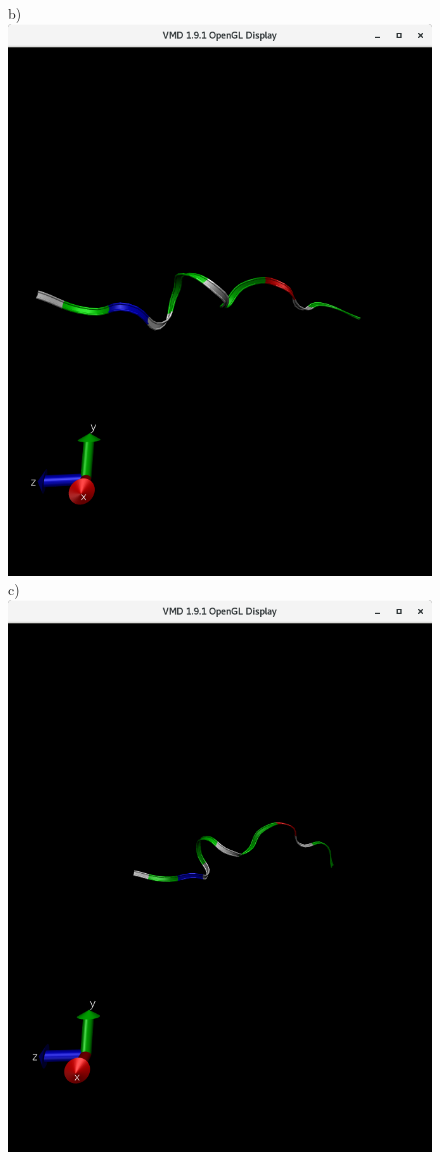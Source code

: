 \documentclass[12pt, onecolumn]{revtex4}    %
\begin{document}
\begin{figure}[h!]
b) \includegraphics[scale=0.15]{301}
c)\includegraphics[scale=0.15]{16_001}

\end{figure}
\end{document}
